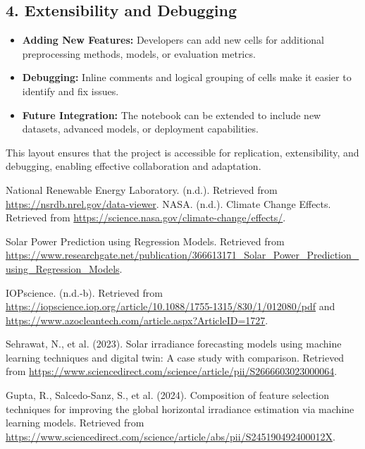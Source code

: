 \documentclass[10pt,twocolumn]{article}
\begin{document}
\begin{itemize}
\subsection*{4. Extensibility and Debugging}
\begin{itemize}
    \item \textbf{Adding New Features:} Developers can add new cells for additional preprocessing methods, models, or evaluation metrics.
    \item \textbf{Debugging:} Inline comments and logical grouping of cells make it easier to identify and fix issues.
    \item \textbf{Future Integration:} The notebook can be extended to include new datasets, advanced models, or deployment capabilities.
\end{itemize}

This layout ensures that the project is accessible for replication, extensibility, and debugging, enabling effective collaboration and adaptation.








\newpage
\begin{thebibliography}{200}

 National Renewable Energy Laboratory. (n.d.). Retrieved from \url{https://nsrdb.nrel.gov/data-viewer}.
 NASA. (n.d.). Climate Change Effects. Retrieved from \url{https://science.nasa.gov/climate-change/effects/}.

 Solar Power Prediction using Regression Models. Retrieved from \url{https://www.researchgate.net/publication/366613171_Solar_Power_Prediction_using_Regression_Models}.

 IOPscience. (n.d.-b). Retrieved from \url{https://iopscience.iop.org/article/10.1088/1755-1315/830/1/012080/pdf} and \url{https://www.azocleantech.com/article.aspx?ArticleID=1727}.

 Sehrawat, N., et al. (2023). Solar irradiance forecasting models using machine learning techniques and digital twin: A case study with comparison. Retrieved from \url{https://www.sciencedirect.com/science/article/pii/S2666603023000064}.

 Gupta, R., Salcedo-Sanz, S., et al. (2024). Composition of feature selection techniques for improving the global horizontal irradiance estimation via machine learning models. Retrieved from \url{https://www.sciencedirect.com/science/article/abs/pii/S245190492400012X}.


\end{thebibliography}
\end{itemize}
\end{document}
